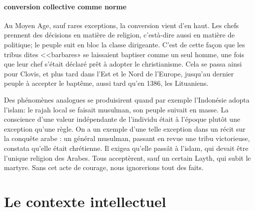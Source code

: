 \paragraph{conversion collective comme norme}
Au Moyen Age, sauf rares exceptions, la conversion vient d'en haut. Les chefs prennent des décisions en matière de religion, c'està-dire aussi en matière de politique; le peuple suit en bloc la classe dirigeante. C'est de cette façon que les tribus dites <<barbares» se laissaient baptiser comme un seul homme, une fois que leur chef s'était déclaré prêt à adopter le christianisme. Cela se passa ainsi pour Clovis, et plus tard dans l'Est et le Nord de l'Europe, jusqu'au dernier peuple à accepter le baptême, aussi tard qu'en 1386, les Lituaniens.


Des phénomènes analogues se produisirent quand par exemple l'Indonésie adopta l'islam: le rajah local se faisait musulman, son peuple suivait en masse. La conscience d'une valeur indépendante de l'individu était à l'époque plutôt une exception qu'une règle. On a un exemple d'une telle exception dans un récit sur la conquête arabe : un général musulman, passant en revue une tribu victorieuse, constata qu'elle était chrétienne. Il exigea qu'elle passât à l'islam, qui devait être l'unique religion des Arabes. Tous acceptèrent, sauf un certain Layth, qui subit le martyre. Sans cet acte de courage, nous ignorerions tout des faits.


\section{Le contexte intellectuel}

